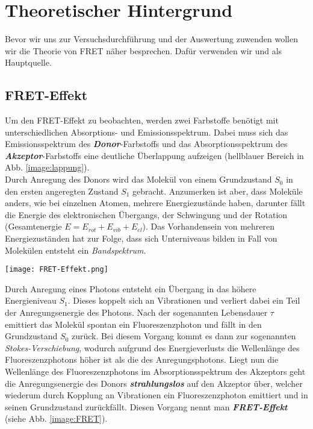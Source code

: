
\chapter{Theoretischer Hintergrund}
\label{chap:theo}
Bevor wir uns zur Versuchsdurchführung und der Auswertung zuwenden wollen wir die Theorie von FRET näher besprechen. Dafür verwenden wir \citep{Anleitung} und \citep{Fluorescence} als Hauptquelle.

\section{FRET-Effekt}
\label{sec:dipolToFRET}
Um den FRET-Effekt zu beobachten, werden zwei Farbstoffe benötigt mit unterschiedlichen Absorptions- und Emissionsspektrum. Dabei muss sich das Emissionsspektrum des \textbf{\textit{Donor}}-Farbstoffs und das Absorptionsspektrum des \textbf{\textit{Akzeptor}}-Farbstoffs eine deutliche Überlappung aufzeigen (hellblauer Bereich in Abb. \ref{image:lappung}).\\

Durch Anregung des Donors wird das Molekül von einem Grundzustand $S_0$ in den ersten angeregten Zustand $S_1$ gebracht. Anzumerken ist aber, dass Moleküle anders, wie bei einzelnen Atomen, mehrere Energiezustände haben, darunter fällt die Energie des elektronischen Übergangs, der Schwingung und der Rotation (Gesamtenergie $E=E_{rot}+E_{vib}+E_{el}$). Das Vorhandensein von mehreren Energiezuständen hat zur Folge, dass sich Unterniveaus bilden in Fall von Molekülen entsteht ein \textit{Bandspektrum}.
\begin{center}
    \texttt{[image: FRET-Effekt.png]}
    \label{image:FRET}
\end{center}
Durch Anregung eines Photons entsteht ein Übergang in das höhere Energieniveau $S_1$. Dieses koppelt sich an Vibrationen und verliert dabei ein Teil der Anregungsenergie des Photons. Nach der sogenannten Lebensdauer $\tau$ emittiert das Molekül spontan ein Fluoreszenzphoton und fällt in den Grundzustand $S_0$ zurück. Bei diesem Vorgang kommt es dann zur sogenannten \textit{Stokes-Verschiebung}, wodurch aufgrund des Energieverlusts die Wellenlänge des Fluoreszenzphotons höher ist als die des Anregungsphotons. Liegt nun die Wellenlänge des Fluoreszenzphotons im Absorptionsspektrum des Akzeptors geht die Anregungsenergie des Donors \textbf{\textit{strahlungslos}} auf den Akzeptor über, welcher wiederum durch Kopplung an Vibrationen ein Fluoreszenzphoton emittiert und in seinen Grundzustand zurückfällt. Diesen Vorgang nennt man \textbf{\textit{FRET-Effekt}} (siehe Abb. \ref{image:FRET}).
\newpage
